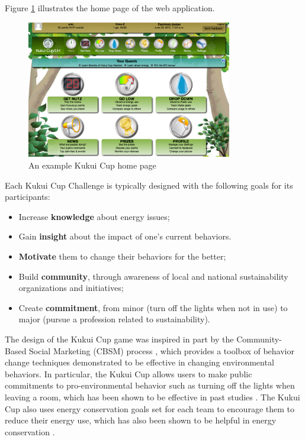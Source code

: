 \documentclass[jou]{apa} %
\begin{document}

Figure \ref{fig:kukuicup-home-page} illustrates the home page of the web application. 

\begin{figure}[htbp]
\begin{center}
\includegraphics[width=0.8\textwidth]{kc-homepage.eps}
\caption{An example Kukui Cup home page}
\label{fig:kukuicup-home-page}
\end{center}
\end{figure}

Each Kukui Cup Challenge is typically designed with the following goals for its participants:
\begin{itemize}
\item Increase {\bf knowledge} about energy issues;
\item Gain {\bf insight} about the impact of one's current behaviors.
\item {\bf Motivate} them to change their behaviors for the better;
\item Build {\bf community}, through awareness of local and national sustainability organizations and initiatives;
\item Create {\bf commitment}, from minor (turn off the lights when not in use) to major (pursue a profession related to sustainability).
\end{itemize}

The design of the Kukui Cup game was inspired in part by the Community-Based
Social Marketing (CBSM) process \cite{McKenzie-Mohr2009}, which provides a
toolbox of behavior change techniques demonstrated to be effective in changing
environmental behaviors. In particular, the Kukui Cup allows users to make
public commitments to pro-environmental behavior such as turning off the lights
when leaving a room, which has been shown to be effective in past studies
\cite{Freedman66, Pallak80}. The Kukui Cup also uses energy conservation goals
set for each team to encourage them to reduce their energy use, which has also
been shown to be helpful in energy conservation \cite{Becker78}.
\end{document}

